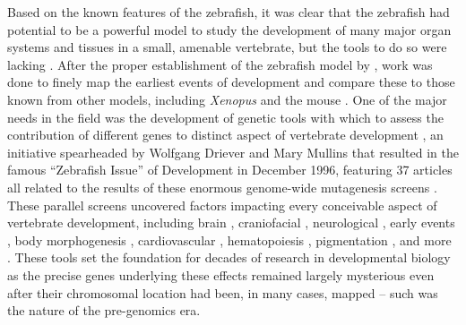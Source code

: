 Based on the known features of the zebrafish, it was clear that the zebrafish had potential to be a powerful model to study the development of many major organ systems and tissues in a small, amenable vertebrate, but the tools to do so were lacking \citep{Bakkers2011}. After the proper establishment of the zebrafish model by \citeauthor{Streisinger1981}, work was done to finely map the earliest events of development and compare these to those known from other models, including \textit{Xenopus} and the mouse \citep{Kimmel1988, Kimmel1989, Kimmel1995}. One of the major needs in the field was the development of genetic tools with which to assess the contribution of different genes to distinct aspect of vertebrate development \citep{Driever1994, Mullins1994}, an initiative spearheaded by Wolfgang Driever and Mary Mullins that resulted in the famous ``Zebrafish Issue'' of Development in December 1996, featuring 37 articles all related to the results of these enormous genome\hyp{}wide mutagenesis screens \citep{Mullins2021, NussleinVolhard2012, Haffter1996, Driever1996, Knapik1996}. These parallel screens uncovered factors impacting every conceivable aspect of vertebrate development, including brain \citep{Schier1996, Heisenberg1996, Jiang1996, Brand1996b, Stemple1996, Odenthal1996a}, craniofacial \citep{Whitfield1996, Malicki1996b, Schilling1996, Piotrowski1996, Neuhauss1996}, neurological \citep{Malicki1996a, FurutaniSeiki1996, Abdelilah1996, Baier1996, Karlstrom1996, Trowe1996}, early events \citep{Kane1996a, Kane1996b}, body morphogenesis \citep{Brand1996a, vanEeden1996a, vanEeden1996b, Hammerschmidt1996a, Mullins1996, Hammerschmidt1996b}, cardiovascular \citep{Stainier1996, Chen1996}, hematopoiesis \citep{Weinstein1996, Ransom1996}, pigmentation \citep{Kelsh1996, Odenthal1996b}, and more \citep{Granato1996, Pack1996}. These tools set the foundation for decades of research in developmental biology as the precise genes underlying these effects remained largely mysterious even after their chromosomal location had been, in many cases, mapped -- such was the nature of the pre\hyp{}genomics era.


